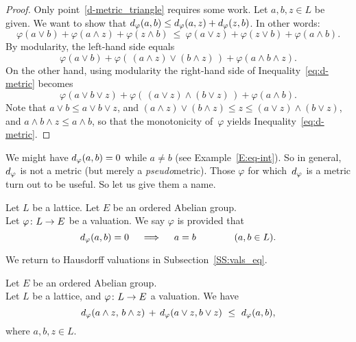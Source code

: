\documentclass[main.tex]{subfiles}
\begin{document}
\begin{proof}
Only point~\ref{d-metric_triangle} requires some work.
Let $a,b,z\in L$ be given.
We want to show that $d_{\smash{\varphi}}(a,b) \leq d_{\smash{\varphi}}(a,z)+d_{\smash{\varphi}}(z,b)$.
In other words:
\begin{equation}
\label{eq:d-metric}
\varphi(a\vee b) + \varphi(a\wedge z) + \varphi (z\wedge b)
\ \leq\ 
\varphi (a\vee z) + \varphi(z\vee b) + \varphi (a\wedge b)\text{.}
\end{equation}
By modularity,
the left-hand side equals
\begin{equation*}
\varphi(a\vee b) 
 + \varphi(\,(a\wedge z)\vee(b\wedge z)\,)
 + \varphi(a\wedge b\wedge z).
\end{equation*}
On the other hand,
using modularity
the right-hand side of Inequality~\eqref{eq:d-metric} becomes
\begin{equation*}
\varphi(a\vee b\vee z)
 + \varphi(\,(a\vee z)\wedge(b\vee z)\,)
 + \varphi(a\wedge b).
\end{equation*}
Note that $a\vee b \leq a\vee b\vee z$,
and $(a\wedge z)\vee (b\wedge z) \leq z \leq (a\vee z)\wedge (b\vee z)$,
and $a\wedge b\wedge z \leq a\wedge b$,
so that the monotonicity of~$\varphi$ yields Inequality~\eqref{eq:d-metric}.
\end{proof}
%
%
We might have $d_{\smash{\varphi}}(a,b) = 0$ while $a\neq b$
(see Example~\ref{E:eq-int}).
So in general, $d_{\smash{\varphi}}$ is not a metric
(but merely a  \emph{pseudo}metric).
Those $\varphi$ for which~$d_{\smash{\varphi}}$ is a metric
turn out to be useful. So let us give them a name.
\begin{dfn}
\label{D:val_Hausdorff}
Let $L$ be a lattice.
Let $E$ be an ordered Abelian group.\\
Let $\varphi\colon L \rightarrow E$ be a valuation.
We say $\varphi$ is 
provided that
\begin{equation*}
d_{\smash{\varphi}}(a,b) = 0 
\quad \implies \quad a=b \qquad\qquad(a,b\in L).
\end{equation*}
\end{dfn}
We return to Hausdorff valuations in Subsection~\ref{SS:vals_eq}.
%
%
\begin{lem}
\label{L:curry-wc-unif}
Let $E$ be an ordered Abelian group.\\
Let $L$ be a lattice,
and $\varphi\colon L \rightarrow E$ a valuation.
We have
\begin{equation*}
d_{\smash{\varphi}}(a\wedge z,\,b\wedge z)\,+\,
 d_{\smash{\varphi}}(a\vee z,b\vee z)\ \leq\ d_{\smash{\varphi}}(a,b),
\end{equation*}
where $a,b,z\in L$.
\end{lem}
\end{document}
